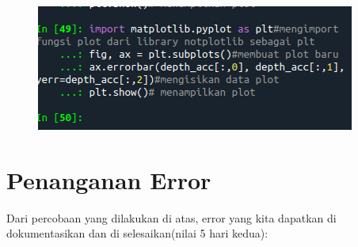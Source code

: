 \begin{enumerate}
\begin{figure}[!htbp]
		\includegraphics[scale=0.5]{figures/chapter2/hasilchapter1.12.PNG}
	\end{figure}
\newpage

\end{enumerate}


\section{Penanganan Error}
Dari percobaan yang dilakukan di atas, error yang kita dapatkan di dokumentasikan dan di selesaikan(nilai 5 hari kedua):

